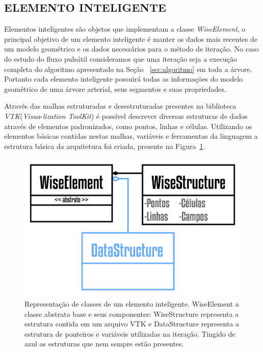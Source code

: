 \documentclass[a4paper,12pt]{monografia}
\theoremstyle{plain}
\theoremstyle{definition}
\theoremstyle{remark}
\begin{document}
\subsection{ELEMENTO INTELIGENTE}\label{sec:elemento_inteligente}

Elementos inteligentes são objetos que implementam a classe \textit{WiseElement}, o principal objetivo de um elemento inteligente é manter os dados mais recentes de um modelo geométrico e os dados necessários para o método de iteração. No caso do estudo do fluxo pulsátil consideramos que uma iteração seja a execução completa do algoritmo apresentado na Seção~ \ref{sec:algoritmo} em toda a árvore. Portanto cada elemento inteligente possuirá todas as informações do modelo geométrico de uma árvore arterial, seus segmentos e suas propriedades.

Através das malhas estruturadas e desestruturadas presentes na biblioteca \textit{VTK}(\textit{Visua}-\textit{lization ToolKit}) é possível descrever diversas estruturas de dados através de elementos padronizados, como pontos, linhas e células. Utilizando os elementos básicas contidas nestas malhas, variáveis e ferramentas da linguagem a estrutura básica da arquitetura foi criada, presente na Figura~\ref{fig2:wiselement}.

\begin{figure}[!htbp]
	\centering
	\includegraphics[scale=2]{Figures/WiseElement@16x.png}
	\caption{Representação de classes de um elemento inteligente. WiseElement a classe abstrata base e seus componentes: WiseStructure representa a estrutura contida em um arquivo VTK e DataStructure representa a estrutura de ponteiros e variáveis utilizadas na iteração. Tingido de azul as estruturas que nem sempre estão presentes.}
	\label{fig2:wiselement}
\end{figure}
\end{document}
